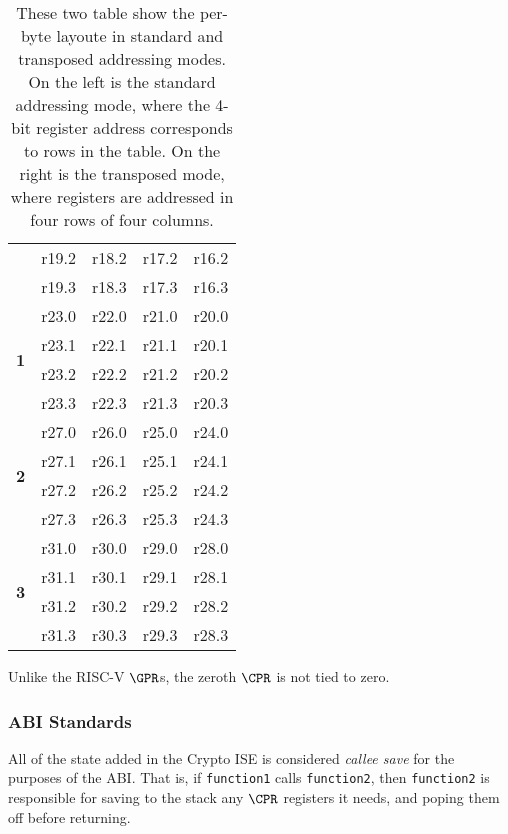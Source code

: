 \begin{table}[h!]
\begin{tabular}{|l|l|l|l|l|}
                            & r19.2   & r18.2   & r17.2   & r16.2   \\
                            & r19.3   & r18.3   & r17.3   & r16.3   \\ \hline
\multirow{4}{*}{\textbf{1}} & r23.0   & r22.0   & r21.0   & r20.0   \\
                            & r23.1   & r22.1   & r21.1   & r20.1   \\
                            & r23.2   & r22.2   & r21.2   & r20.2   \\
                            & r23.3   & r22.3   & r21.3   & r20.3   \\ \hline
\multirow{4}{*}{\textbf{2}} & r27.0   & r26.0   & r25.0   & r24.0   \\
                            & r27.1   & r26.1   & r25.1   & r24.1   \\
                            & r27.2   & r26.2   & r25.2   & r24.2   \\
                            & r27.3   & r26.3   & r25.3   & r24.3   \\ \hline
\multirow{4}{*}{\textbf{3}} & r31.0   & r30.0   & r29.0   & r28.0   \\
                            & r31.1   & r30.1   & r29.1   & r28.1   \\
                            & r31.2   & r30.2   & r29.2   & r28.2   \\
                            & r31.3   & r30.3   & r29.3   & r28.3   \\ \hline
\end{tabular}
\caption{These two table show the per-byte layoute in standard and transposed
addressing modes. On the left is the standard addressing mode, where the
4-bit register address corresponds to rows in the table. On the right
is the transposed mode, where registers are addressed in four rows of
four columns.}
\label{tab:state-addr}
\end{table}

Unlike the RISC-V $\GPR$s, the zeroth $\CPR$ is not tied to zero.

\subsubsection{ABI Standards}

All of the state added in the Crypto ISE is considered {\em callee save}
for the purposes of the ABI. That is, if {\tt function1} calls 
{\tt function2}, then {\tt function2} is responsible for saving to the
stack any $\CPR$ registers it needs, and poping them off before returning.

